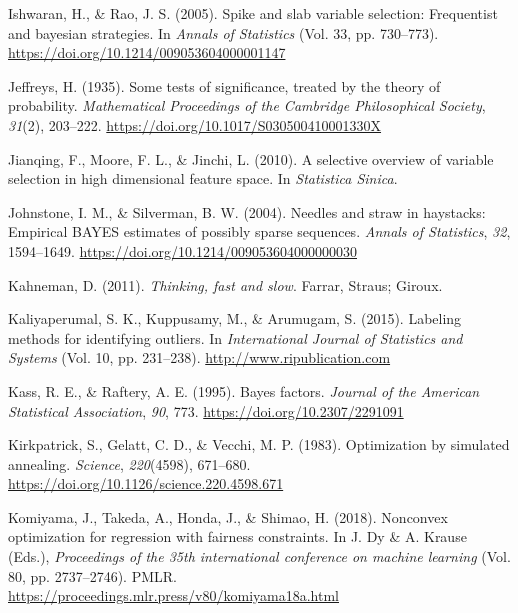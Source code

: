 \documentclass[
  11pt,
]{article}
\newlength{\cslhangindent}
\newlength{\cslentryspacingunit} %
\newenvironment{CSLReferences}[2] %
 {%
  \setlength{\parindent}{0pt}
  \ifodd #1
  \let\oldpar\par
  \def\par{\hangindent=\cslhangindent\oldpar}
  \fi
  \setlength{\parskip}{#2\cslentryspacingunit}
 }%
 {}
\begin{document}
\begin{CSLReferences}{1}{0}
\leavevmode{}%
Ishwaran, H., \& Rao, J. S. (2005). Spike and slab variable selection:
Frequentist and bayesian strategies. In \emph{Annals of Statistics}
(Vol. 33, pp. 730--773).
\url{https://doi.org/10.1214/009053604000001147}

\leavevmode{}%
Jeffreys, H. (1935). Some tests of significance, treated by the theory
of probability. \emph{Mathematical Proceedings of the Cambridge
Philosophical Society}, \emph{31}(2), 203--222.
\url{https://doi.org/10.1017/S030500410001330X}

\leavevmode{}%
Jianqing, F., Moore, F. L., \& Jinchi, L. (2010). A selective overview
of variable selection in high dimensional feature space. In
\emph{Statistica Sinica}.

\leavevmode{}%
Johnstone, I. M., \& Silverman, B. W. (2004). Needles and straw in
haystacks: Empirical BAYES estimates of possibly sparse sequences.
\emph{Annals of Statistics}, \emph{32}, 1594--1649.
\url{https://doi.org/10.1214/009053604000000030}

\leavevmode{}%
Kahneman, D. (2011). \emph{Thinking, fast and slow}. Farrar, Straus;
Giroux.

\leavevmode{}%
Kaliyaperumal, S. K., Kuppusamy, M., \& Arumugam, S. (2015). Labeling
methods for identifying outliers. In \emph{International Journal of
Statistics and Systems} (Vol. 10, pp. 231--238).
\url{http://www.ripublication.com}

\leavevmode{}%
Kass, R. E., \& Raftery, A. E. (1995). Bayes factors. \emph{Journal of
the American Statistical Association}, \emph{90}, 773.
\url{https://doi.org/10.2307/2291091}

\leavevmode{}%
Kirkpatrick, S., Gelatt, C. D., \& Vecchi, M. P. (1983). Optimization by
simulated annealing. \emph{Science}, \emph{220}(4598), 671--680.
\url{https://doi.org/10.1126/science.220.4598.671}

\leavevmode{}%
Komiyama, J., Takeda, A., Honda, J., \& Shimao, H. (2018). Nonconvex
optimization for regression with fairness constraints. In J. Dy \& A.
Krause (Eds.), \emph{Proceedings of the 35th international conference on
machine learning} (Vol. 80, pp. 2737--2746). PMLR.
\url{https://proceedings.mlr.press/v80/komiyama18a.html}


\end{CSLReferences}
\end{document}
